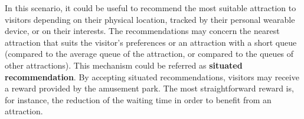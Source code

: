 In this scenario, it could be useful to recommend the most suitable attraction to visitors depending on their physical location, tracked by their personal wearable device, or on their interests.
The recommendations may concern the nearest attraction that suits the visitor's preferences or an attraction with a short queue (compared to the average queue of the attraction, or compared to the queues of other attractions).
This mechanism could be referred as \textbf{situated recommendation}.
By accepting situated recommendations, visitors may receive a reward provided by the amusement park.
The most straightforward reward is, for instance, the reduction of the waiting time in order to benefit from an attraction.
